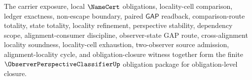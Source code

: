 \begin{theorem}
\label{thm:observer-perspective-classifier-obligation-unblock-package}
The carrier exposure, local $\NameCert$ obligations, locality-cell comparison, ledger exactness, non-escape boundary, paired $\mathsf{GAP}$ readback, comparison-route totality, state totality, locality refinement, perspective stability, dependency scope, alignment-consumer discipline, observer-state GAP route, cross-alignment locality soundness, locality-cell exhaustion, two-observer source admission, alignment-locality cycle, and obligation-closure witness together form the finite $\ObserverPerspectiveClassifierUp$ obligation package for obligation-level closure.
\end{theorem}
